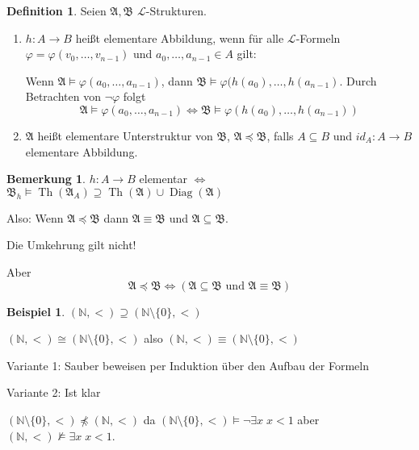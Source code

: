 \documentclass[12pt,parskip=full]{scrartcl}
\newcommand{\setN}{\mathbb{N}}
\theoremstyle{definition}
\newtheorem{definition}[theorem]{Definition}
\newtheorem{example}[theorem]{Beispiel}
\newtheorem{remark}[theorem]{Bemerkung}
\begin{document}
	\begin{definition}
		Seien $\mathfrak{A}, \mathfrak{B}$ $\mathcal{L}$-Strukturen. \begin{enumerate}
			\item $h: A \to B$ heißt elementare Abbildung, wenn für alle $\mathcal{L}$-Formeln $\varphi = \varphi(v_0, \dots, v_{n-1})$ und $a_0, \dots, a_{n-1} \in A$ gilt:
			
			Wenn $\mathfrak{A} \models \varphi(a_0, \dots, a_{n-1})$, dann $\mathfrak{B} \models \varphi(h(a_0), \dots, h(a_{n-1})$. Durch Betrachten von $\lnot \varphi$ folgt
			\begin{equation*}
				\mathfrak{A} \models \varphi(a_0, \dots, a_{n-1}) \Leftrightarrow \mathfrak{B} \models \varphi(h(a_0), \dots, h(a_{n-1}))
			\end{equation*}
			\item $\mathfrak{A}$ heißt elementare Unterstruktur von $\mathfrak{B}$, $\mathfrak{A} \preceq \mathfrak{B}$, falls $A \subseteq B$ und $id_A: A \to B$ elementare Abbildung.
		\end{enumerate}
	\end{definition}

	\begin{remark}
		$h: A \to B$ elementar $\Leftrightarrow$ $\mathfrak{B}_h \models \operatorname{Th}(\mathfrak{A}_A) \supseteq \operatorname{Th}(\mathfrak{A}) \cup \operatorname{Diag}(\mathfrak{A})$
		
		Also: Wenn $\mathfrak{A} \preceq \mathfrak{B}$ dann $\mathfrak{A} \equiv \mathfrak{B}$ und $\mathfrak{A} \subseteq \mathfrak{B}$.
		
		Die Umkehrung gilt nicht!
		
		Aber
		\begin{equation*}
			\mathfrak{A} \preceq \mathfrak{B} \Leftrightarrow (\mathfrak{A} \subseteq \mathfrak{B} \text{ und } \mathfrak{A} \equiv \mathfrak{B})
		\end{equation*}
	\end{remark}

	\begin{example}
		$(\setN, <) \supseteq (\setN \setminus \{ 0 \}, <)$
		
		$(\setN, <) \cong (\setN \setminus \{ 0 \}, <)$ also $(\setN, <) \equiv (\setN \setminus \{ 0 \}, <)$
		
		Variante 1: Sauber beweisen per Induktion über den Aufbau der Formeln
		
		Variante 2: Ist klar
		
		$(\setN \setminus \{ 0 \}, <) \npreceq (\setN, <)$ da $(\setN \setminus \{ 0 \}, <) \models \lnot \exists x \; x < 1$ aber $(\setN, <) \not\models \exists x \; x < 1$.
	\end{example}
\end{document}
